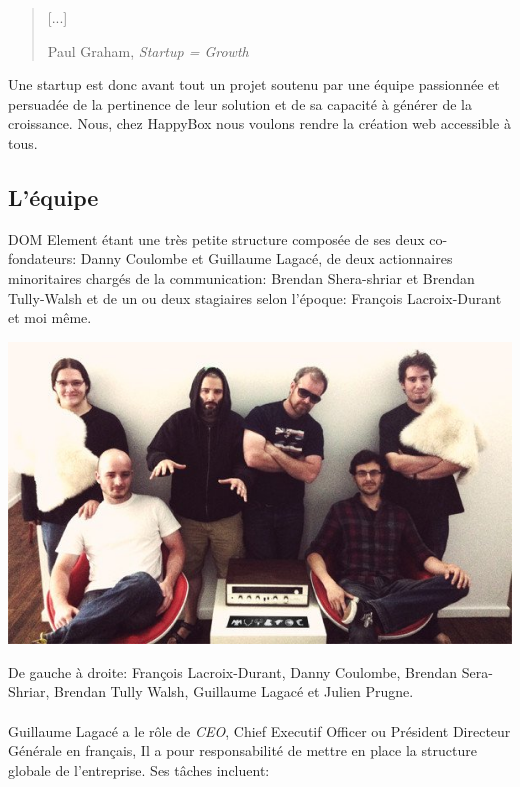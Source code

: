 \documentclass[11pt, a4paper ]{article}
\begin{document}
\begin{spacing}{1.5}
\begin{quote}
	[...]


	\caption{Paul Graham, \emph{Startup = Growth\cite{startupGrowth}}}
\end{quote}

Une startup est donc avant tout un projet soutenu par une équipe passionnée et persuadée de la pertinence de leur solution et de sa capacité à générer de la croissance. Nous, chez HappyBox nous voulons rendre la création web accessible à tous.

		\subsection{L'équipe} %
DOM Element étant une très petite structure composée de ses deux co-fondateurs: Danny Coulombe et Guillaume Lagacé, de deux actionnaires minoritaires chargés de la communication: Brendan Shera-shriar et Brendan Tully-Walsh et de un ou deux stagiaires selon l'époque: François Lacroix-Durant et moi même.
\begin{center}
	\includegraphics[width=\textwidth]{images/team/team.jpg}

	 De gauche à droite: François Lacroix-Durant, Danny Coulombe, Brendan Sera-Shriar, Brendan Tully Walsh, Guillaume Lagacé et Julien Prugne.
\end{center}

\paragraph{}
	Guillaume Lagacé a le rôle de \emph{CEO}, Chief Executif Officer ou Président Directeur Générale en français, Il a pour responsabilité de mettre en place la structure globale de l'entreprise.
	Ses tâches incluent:


\end{spacing}
\end{document}
